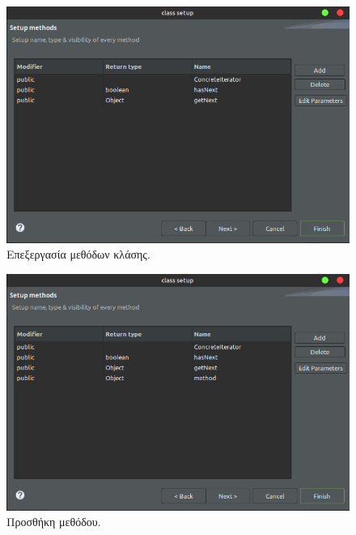 \begin{figure}[H]
    \centering
    \includegraphics[width=1.0\textwidth]{Figures/edit_class_methods.png}
    \caption{Επεξεργασία μεθόδων κλάσης.}
    \label{fig:edit_class_methods}
\end{figure}
\begin{figure}[H]
    \centering
    \includegraphics[width=1.0\textwidth]{Figures/add_method.png}
    \caption{Προσθήκη μεθόδου.}
    \label{fig:add_method}
\end{figure}
